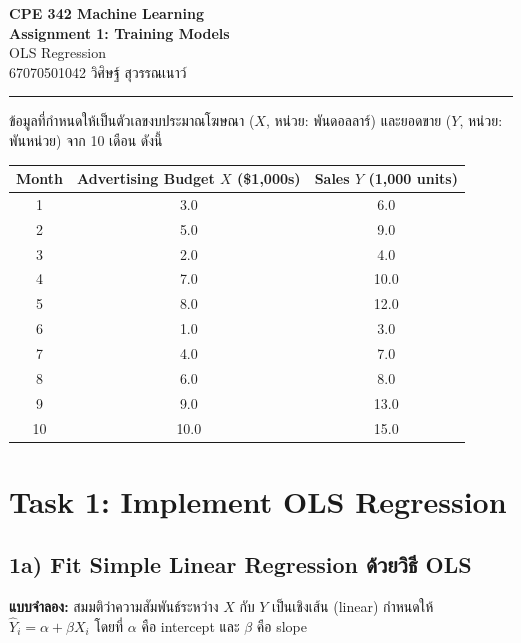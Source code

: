 \documentclass[12pt,a4paper]{article}
\begin{document}
\begin{center}
    {\Large\textbf{CPE 342 Machine Learning}}\\[2pt]
    {\Large\textbf{Assignment 1: Training Models}}\\[4pt]
    {\large OLS Regression}\\[6pt]
    \textcolor{accentblue}{67070501042 วิศิษฐ์ สุวรรณเนาว์}
\end{center}

\noindent\rule{\textwidth}{0.4pt}\vspace{4pt}

\noindent
ข้อมูลที่กำหนดให้เป็นตัวเลขงบประมาณโฆษณา ($X$, หน่วย: พันดอลลาร์) และยอดขาย ($Y$, หน่วย: พันหน่วย) จาก 10 เดือน ดังนี้

\begin{table}[H]
\centering
\begin{tabular}{c c c}
\toprule
\textbf{Month} & \textbf{Advertising Budget $X$ (\$1,000s)} & \textbf{Sales $Y$ (1,000 units)} \\
\midrule
1  & 3.0  & 6.0  \\
2  & 5.0  & 9.0  \\
3  & 2.0  & 4.0  \\
4  & 7.0  & 10.0 \\
5  & 8.0  & 12.0 \\
6  & 1.0  & 3.0  \\
7  & 4.0  & 7.0  \\
8  & 6.0  & 8.0  \\
9  & 9.0  & 13.0 \\
10 & 10.0 & 15.0 \\
\bottomrule
\end{tabular}
\end{table}

\section*{Task 1: Implement OLS Regression}

\subsection*{1a) Fit Simple Linear Regression ด้วยวิธี OLS}

\textbf{แบบจำลอง:}
สมมติว่าความสัมพันธ์ระหว่าง $X$ กับ $Y$ เป็นเชิงเส้น (linear) กำหนดให้ $\hat{Y}_i = \alpha + \beta X_i$ 
โดยที่ $\alpha$ คือ intercept และ $\beta$ คือ slope 
\end{document}

